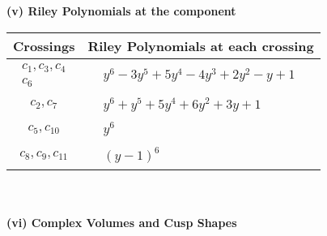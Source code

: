 \documentclass[1p]{elsarticle_modified}
\theoremstyle{definition}
\begin{document}
\newpage\renewcommand{\arraystretch}{1}
\flushleft \textbf{(v) Riley Polynomials at the component}\newline \\
\begin{tabular}{m{50pt}|m{274pt}}
Crossings & \hspace{64pt}Riley Polynomials at each crossing \\
\hline $$\begin{aligned}c_{1},c_{3},c_{4}\\c_{6}\end{aligned}$$&$\begin{aligned}
&y^6-3 y^5+5 y^4-4 y^3+2 y^2- y+1
\end{aligned}$\\
\hline $$\begin{aligned}c_{2},c_{7}\end{aligned}$$&$\begin{aligned}
&y^6+y^5+5 y^4+6 y^2+3 y+1
\end{aligned}$\\
\hline $$\begin{aligned}c_{5},c_{10}\end{aligned}$$&$\begin{aligned}
&y^6
\end{aligned}$\\
\hline $$\begin{aligned}c_{8},c_{9},c_{11}\end{aligned}$$&$\begin{aligned}
&(y-1)^6
\end{aligned}$\\
\hline
\end{tabular}\\~\\
\newpage\flushleft \textbf{(vi) Complex Volumes and Cusp Shapes}
\end{document}
